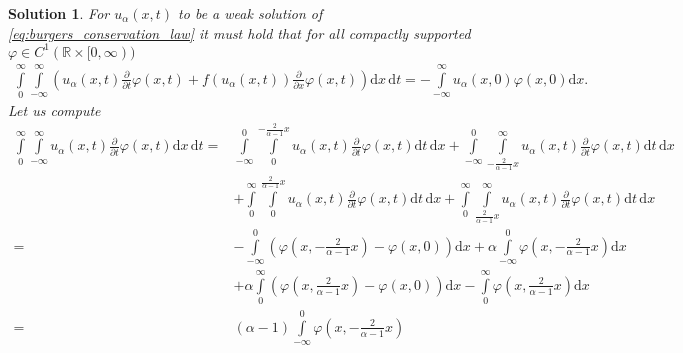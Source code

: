 \documentclass[10pt,letterpaper]{article}
\theoremstyle{break}
\newtheorem{mysolution}{Solution}
\newenvironment{solution}{\begin{mysolution}}{\end{mysolution}}
\begin{document}
\begin{solution}
    For $u_\alpha(x,t)$ to be a weak solution of
    \eqref{eq:burgers_conservation_law} it must hold that
    for all compactly supported $\varphi \in C^1(\mathbb{R} \times [0,\infty))$
    \begin{align}
    	\int\limits_{0}^{\infty}
    	\int\limits_{-\infty}^{\infty}
    	\left(
    		u_\alpha(x,t)
    		\frac{\partial}{\partial t} \varphi(x,t)
    		+
    		f(u_\alpha(x,t))
    		\frac{\partial}{\partial x} \varphi(x,t)
    	\right)
    	\text{d}x\, \text{d}t
    	=
    	-
    	\int\limits_{-\infty}^{\infty}
    	u_\alpha(x,0)
    	\varphi(x,0) 
    	\text{d}x.
    \end{align} 
    Let us compute
    \begin{equation}\label{eq:int_dt}
    \begin{aligned}
    	\int\limits_{0}^{\infty}
    	\int\limits_{-\infty}^{\infty}
    	u_\alpha(x,t)
    	\frac{\partial}{\partial t} \varphi(x,t)
    	\text{d}x\, \text{d}t
    	=
    	&
    	\int\limits_{-\infty}^{0}
    	\int\limits_{0}^{-\frac{2}{\alpha-1}x}
    	u_\alpha(x,t)
    	\frac{\partial}{\partial t} \varphi(x,t)
    	\text{d}t\, \text{d}x
    	+
    	\int\limits_{-\infty}^{0}
    	\int\limits_{-\frac{2}{\alpha-1}x}^{\infty}
    	u_\alpha(x,t)
    	\frac{\partial}{\partial t} \varphi(x,t)
    	\text{d}t\, \text{d}x \\
    	&
    	+
    	\int\limits_{0}^{\infty}
    	\int\limits_{0}^{\frac{2}{\alpha-1}x}
    	u_\alpha(x,t)
    	\frac{\partial}{\partial t} \varphi(x,t)
    	\text{d}t\, \text{d}x
    	+
    	\int\limits_{0}^{\infty}
    	\int\limits_{\frac{2}{\alpha-1}x}^{\infty}
    	u_\alpha(x,t)
    	\frac{\partial}{\partial t} \varphi(x,t)
    	\text{d}t\, \text{d}x \\
    	=
    	&
    	-
    	\int\limits_{-\infty}^{0}
    	\left(
    		\varphi
    		\left(x,-\frac{2}{\alpha-1}x\right)
    		-
    		\varphi(x,0)
    	\right)
    	\text{d}x
    	+
    	\alpha
    	\int\limits_{-\infty}^{0}
    	\varphi
    	\left(x,-\frac{2}{\alpha-1}x\right)
    	\text{d}x \\
    	&
    	+
    	\alpha
    	\int\limits_{0}^{\infty}
    	\left(
    		\varphi
    		\left(x,\frac{2}{\alpha-1}x\right)
    		-
    		\varphi(x,0)
    	\right)
    	\text{d}x
    	-
    	\int\limits_{0}^{\infty}
    	\varphi
    	\left(x,\frac{2}{\alpha-1}x\right) 
    	\text{d}x \\
    	=
    	&
    	(\alpha-1)
    	\int\limits_{-\infty}^{0}
    	\varphi
    	\left(x,-\frac{2}{\alpha-1}x\right)

\end{aligned}
\end{equation}
\end{solution}
\end{document}
